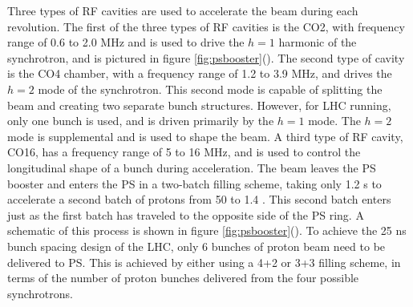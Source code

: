 \par Three types of RF cavities are used to accelerate the beam
during each revolution.  The first of the three types of RF cavities
is the CO2, with frequency range of 0.6 to 2.0 MHz and is used to
drive the $h=1$ harmonic of the  synchrotron, and is pictured in
figure \ref{fig:psbooster}().  The
second type of cavity is the CO4 chamber, with a frequency range of
1.2 to 3.9 MHz, and drives the $h=2$ mode of the synchrotron.  This
second mode is capable of splitting the beam and creating two separate
bunch  structures.  However, for LHC running, only one bunch is used,
and is driven primarily by the $h=1$ mode.  The $h=2$ mode is
supplemental and is used to shape the beam.  A third type of RF
cavity, CO16, has a frequency range of 5 to 16 MHz, and is used to
control the longitudinal shape of a bunch during acceleration. The beam
leaves the PS booster and enters the PS in a two-batch filling scheme,
taking only 1.2 s to accelerate a second batch of protons from 50 \MeV
to 1.4 \GeV.  This second batch enters just as the first batch has
traveled to the opposite side of the PS ring.  A schematic of this
process is shown in figure
\ref{fig:psbooster}().  To achieve
the 25 ns bunch spacing design of the LHC, only 6 bunches of proton
beam need to be delivered to PS.  This is achieved by either using a
4+2 or 3+3 filling scheme, in terms of the number of proton bunches
delivered from the four possible synchrotrons.   

